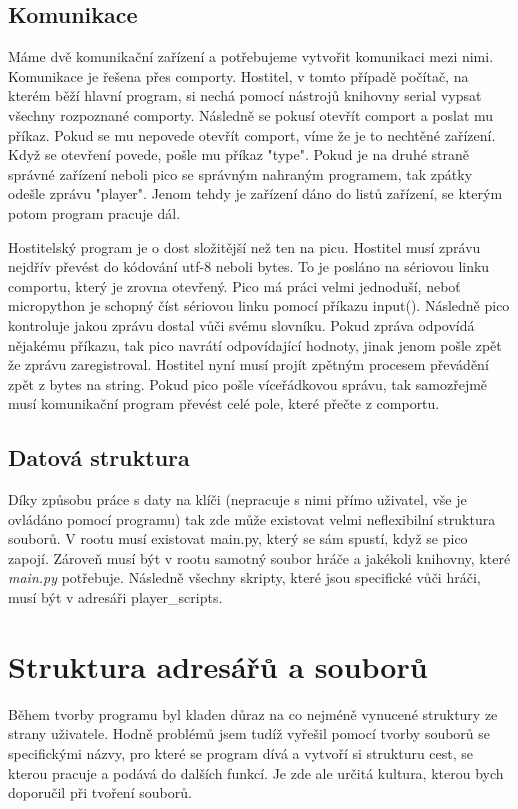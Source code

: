 \documentclass[12pt,a4paper]{article}
\begin{document}
\subsection{Komunikace}
Máme dvě komunikační zařízení a potřebujeme vytvořit komunikaci mezi nimi. Komunikace je řešena přes comporty. Hostitel, v tomto případě počítač, na kterém běží hlavní program, si nechá pomocí nástrojů knihovny serial vypsat všechny rozpoznané comporty. Následně se pokusí otevřít comport a poslat mu příkaz. Pokud se mu nepovede otevřít comport, víme že je to nechtěné zařízení. Když se otevření povede, pošle mu příkaz "type". Pokud je na druhé straně správné zařízení neboli pico se správným nahraným programem, tak zpátky odešle zprávu "player". Jenom tehdy je zařízení dáno do listů zařízení, se kterým potom program pracuje dál.

Hostitelský program je o dost složitější než ten na picu. Hostitel musí zprávu nejdřív převést do kódování utf-8 neboli bytes. To je posláno na sériovou linku comportu, který je zrovna otevřený. Pico má práci velmi jednoduší, neboť micropython je schopný číst sériovou linku pomocí příkazu input(). Následně pico kontroluje jakou zprávu dostal vůči svému slovníku. Pokud zpráva odpovídá nějakému příkazu, tak pico navrátí odpovídající hodnoty, jinak jenom pošle zpět že zprávu zaregistroval. Hostitel nyní musí projít zpětným procesem převádění zpět z bytes na string. Pokud pico pošle víceřádkovou správu, tak samozřejmě musí komunikační program převést celé pole, které přečte z comportu. 

\subsection{Datová struktura}
Díky způsobu práce s daty na klíči (nepracuje s nimi přímo uživatel, vše je ovládáno pomocí programu) tak zde může existovat velmi neflexibilní struktura souborů. V rootu musí existovat main.py, který se sám spustí, když se pico zapojí. Zároveň musí být v rootu samotný soubor hráče a jakékoli knihovny, které \textit{main.py} potřebuje. Následně všechny skripty, které jsou specifické vůči hráči, musí být v adresáři player\_scripts.
\section{Struktura adresářů a souborů}
Během tvorby programu byl kladen důraz na co nejméně vynucené struktury ze strany uživatele. Hodně problémů jsem tudíž vyřešil pomocí tvorby souborů se specifickými názvy, pro které se program dívá a vytvoří si strukturu cest, se kterou pracuje a podává do dalších funkcí. Je zde ale určitá kultura, kterou bych doporučil při tvoření souborů.
\end{document}
